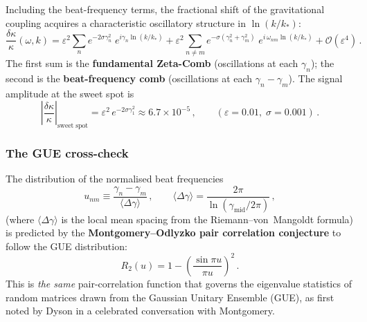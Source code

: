 \documentclass[12pt,a4paper]{article}
\begin{document}
Including the beat-frequency terms, the fractional shift of the
gravitational coupling acquires a characteristic oscillatory structure
in $\ln(k/k_{*})$:
\begin{equation}\label{eq:delta-kappa-full}
  \frac{\delta\kappa}{\kappa}(\omega,k)
  = \varepsilon^{2}\sum_{n}
    e^{-2\sigma\gamma_{n}^{2}}\;
    e^{i\gamma_{n}\ln(k/k_{*})}
  + \varepsilon^{2}\!\!\!
    \sum_{n\neq m}
    e^{-\sigma(\gamma_{n}^{2}+\gamma_{m}^{2})}\;
    e^{i\,\omega_{nm}\ln(k/k_{*})}
  + \mathcal{O}(\varepsilon^{4})\,.
\end{equation}
The first sum is the \textbf{fundamental Zeta-Comb}
(oscillations at each $\gamma_{n}$); the second is the
\textbf{beat-frequency comb} (oscillations at each
$\gamma_{n}-\gamma_{m}$).  The signal amplitude at the sweet spot is
\begin{equation}\label{eq:signal-amplitude}
  \left|\frac{\delta\kappa}{\kappa}\right|_{\mathrm{sweet\;spot}}
  = \varepsilon^{2}\,e^{-2\sigma\gamma_{1}^{2}}
  \approx 6.7\times 10^{-5}\,,
  \qquad
  (\varepsilon=0.01,\;\sigma=0.001)\,.
\end{equation}

\subsubsection{The GUE cross-check}\label{sssec:GUE-crosscheck}

The distribution of the normalised beat frequencies
\begin{equation}\label{eq:u-def}
  u_{nm}
  \equiv \frac{\gamma_{n}-\gamma_{m}}{\langle\Delta\gamma\rangle}\,,
  \qquad
  \langle\Delta\gamma\rangle
  = \frac{2\pi}{\ln(\gamma_{\mathrm{mid}}/2\pi)}\,,
\end{equation}
(where $\langle\Delta\gamma\rangle$ is the local mean spacing from
the Riemann--von~Mangoldt formula) is predicted by the
\textbf{Montgomery--Odlyzko pair correlation conjecture} to follow
the GUE distribution:
\begin{equation}\label{eq:R2-GUE}
  \boxed{
  R_{2}(u)
  = 1-\left(\frac{\sin\pi u}{\pi u}\right)^{2}\,.}
\end{equation}
This is \emph{the same} pair-correlation function that governs the
eigenvalue statistics of random matrices drawn from the Gaussian
Unitary Ensemble (GUE), as first noted by Dyson in a celebrated
conversation with Montgomery.
\end{document}
